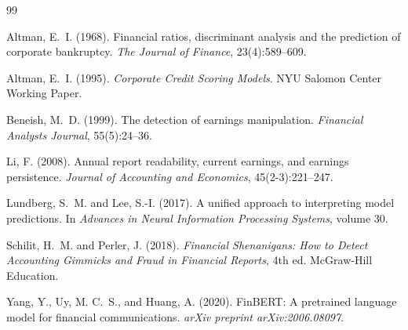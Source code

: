 \documentclass[12pt, a4paper]{article}
\begin{document}
\newpage


\begin{thebibliography}{99}

Altman, E.~I. (1968).
\newblock Financial ratios, discriminant analysis and the prediction of
  corporate bankruptcy.
\newblock \emph{The Journal of Finance}, 23(4):589--609.

Altman, E.~I. (1995).
\newblock \emph{Corporate Credit Scoring Models}.
\newblock NYU Salomon Center Working Paper.

Beneish, M.~D. (1999).
\newblock The detection of earnings manipulation.
\newblock \emph{Financial Analysts Journal}, 55(5):24--36.

Li, F. (2008).
\newblock Annual report readability, current earnings, and earnings
  persistence.
\newblock \emph{Journal of Accounting and Economics}, 45(2-3):221--247.

Lundberg, S.~M. and Lee, S.-I. (2017).
\newblock A unified approach to interpreting model predictions.
\newblock In \emph{Advances in Neural Information Processing Systems}, volume 30.

Schilit, H.~M. and Perler, J. (2018).
\newblock \emph{Financial Shenanigans: How to Detect Accounting Gimmicks and
  Fraud in Financial Reports}, 4th ed.
\newblock McGraw-Hill Education.

Yang, Y., Uy, M. C.~S., and Huang, A. (2020).
\newblock FinBERT: A pretrained language model for financial communications.
\newblock \emph{arXiv preprint arXiv:2006.08097}.

\end{thebibliography}
\end{document}
